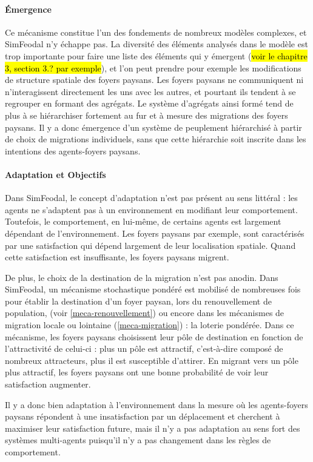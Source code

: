 \paragraph{Émergence} Ce mécanisme constitue l'un des fondements de nombreux modèles complexes, et SimFeodal n'y échappe pas.
La diversité des éléments analysés dans le modèle est trop importante pour faire une liste des éléments qui y émergent (\hl{voir le chapitre 3, section 3.? par exemple}), et l'on peut prendre pour exemple les modifications de structure spatiale des foyers paysans.
Les foyers paysans ne communiquent ni n'interagissent directement les uns avec les autres, et pourtant ils tendent à se regrouper en formant des agrégats.
Le système d'agrégats ainsi formé tend de plus à se hiérarchiser fortement au fur et à mesure des migrations des foyers paysans.
Il y a donc émergence d'un système de peuplement hiérarchisé à partir de choix de migrations individuels, sans que cette hiérarchie soit inscrite dans les intentions des agents-foyers paysans.

\paragraph{Adaptation et Objectifs} Dans SimFeodal, le concept d'adaptation n'est pas présent au sens littéral : les agents ne s'adaptent pas à un environnement en modifiant leur comportement.
Toutefois, le comportement, en lui-même, de certains agents est largement dépendant de l'environnement.
Les foyers paysans par exemple, sont caractérisés par une satisfaction qui dépend largement de leur localisation spatiale.
Quand cette satisfaction est insuffisante, les foyers paysans migrent.

De plus, le choix de la destination de la migration n'est pas anodin.
Dans SimFeodal, un mécanisme stochastique pondéré est mobilisé de nombreuses fois pour établir la destination d'un foyer paysan, lors du renouvellement de population, (voir \cref{meca-renouvellement}) ou encore dans les mécanismes de migration locale ou lointaine (\cref{meca-migration}) : 
la \og loterie pondérée\fg{}.
Dans ce mécanisme, les foyers paysans \og choisissent\fg{} leur pôle de destination en fonction de l'attractivité de celui-ci :
plus un pôle est attractif, c'est-à-dire composé de nombreux attracteurs, plus il est susceptible d'attirer.
En migrant vers un pôle plus attractif, les foyers paysans ont une bonne probabilité de voir leur satisfaction augmenter.

Il y a donc bien adaptation à l'environnement dans la mesure où les agents-foyers paysans répondent à une insatisfaction par un déplacement et cherchent à maximiser leur satisfaction future, mais il n'y a pas adaptation au sens fort des systèmes multi-agents puisqu'il n'y a pas changement dans les règles de comportement.

